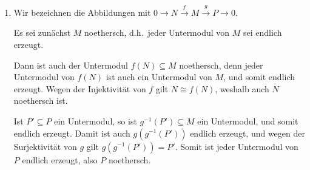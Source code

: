\begin{solution}
  \begin{enumerate}
    \item
      Wir bezeichnen die Abbildungen mit $0 \to N \xrightarrow{f} M \xrightarrow{g} P \to 0$.
      
      Es sei zunächst $M$ noethersch, d.h.\ jeder Untermodul von $M$ sei endlich erzeugt.
      
      Dann ist auch der Untermodul $f(N) \subseteq M$ noethersch, denn jeder Untermodul von $f(N)$ ist auch ein Untermodul von $M$, und somit endlich erzeugt.
      Wegen der Injektivität von $f$ gilt $N \cong f(N)$, weshalb auch $N$ noethersch ist.
      
      Ist $P' \subseteq P$ ein Untermodul, so ist $g^{-1}(P') \subseteq M$ ein Untermodul, und somit endlich erzeugt.
      Damit ist auch $g(g^{-1}(P'))$ endlich erzeugt, und wegen der Surjektivität von $g$ gilt $g(g^{-1}(P')) = P'$.
      Somit ist jeder Untermodul von $P$ endlich erzeugt, also $P$ noethersch.
      

\end{enumerate}
\end{solution}
